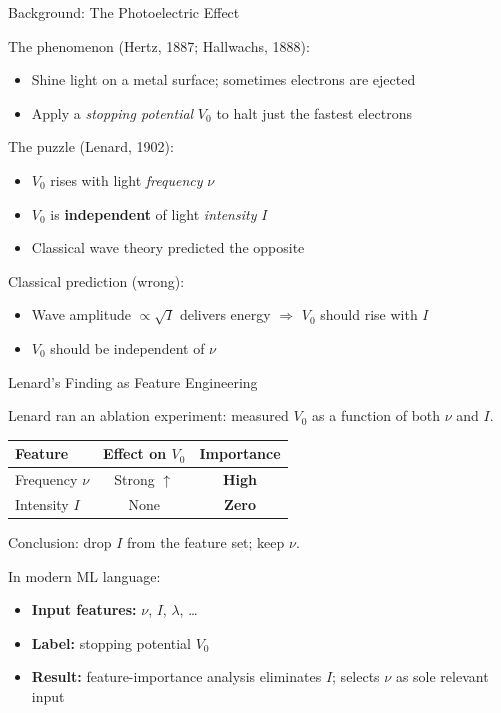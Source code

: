 \documentclass[aspectratio=169]{beamer}
\begin{document}
\begin{frame}{Background: The Photoelectric Effect}

The phenomenon (Hertz, 1887; Hallwachs, 1888):
\begin{itemize}
  \item Shine light on a metal surface; sometimes electrons are ejected
  \item Apply a \emph{stopping potential} $V_0$ to  halt just the
    fastest electrons
\end{itemize}

\medskip
The puzzle (Lenard, 1902):
\begin{itemize}
  \item $V_0$ rises with light \emph{frequency} $\nu$
  \item $V_0$ is \textbf{independent} of light \emph{intensity} $I$
  \item Classical wave theory predicted the opposite
\end{itemize}

\medskip
Classical prediction (wrong):
\begin{itemize}
  \item Wave amplitude $\propto \sqrt{I}$ delivers energy
    $\Rightarrow$ $V_0$ should rise with $I$
  \item $V_0$ should be independent of $\nu$
\end{itemize}

\end{frame}

\begin{frame}{Lenard's Finding as Feature Engineering}

Lenard ran an ablation experiment: measured $V_0$ as a function of
both $\nu$ and $I$.

\medskip
\begin{center}
\begin{tabular}{lcc}
\toprule
Feature & Effect on $V_0$ & Importance \\
\midrule
Frequency $\nu$ & Strong $\uparrow$ & \textbf{High} \\
Intensity $I$  & None             & \textbf{Zero} \\
\bottomrule
\end{tabular}
\end{center}

\medskip
Conclusion: drop $I$ from the feature set; keep $\nu$.

\bigskip
In modern ML language:
\begin{itemize}
  \item \textbf{Input features:} $\nu$, $I$, $\lambda$, \ldots
  \item \textbf{Label:} stopping potential $V_0$
  \item \textbf{Result:} feature-importance analysis eliminates $I$;
    selects $\nu$ as sole relevant input
\end{itemize}

\end{frame}
\end{document}
